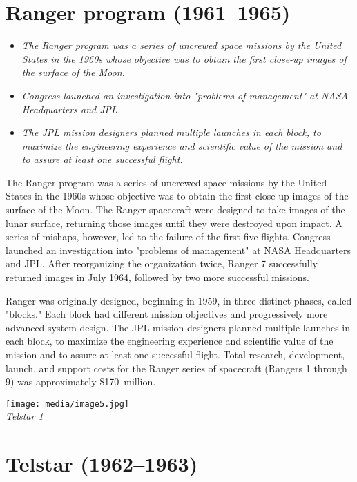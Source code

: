\section{Ranger program (1961--1965)}\label{ranger-program-19611965}

\begin{itemize}
\item
  \emph{The Ranger program was a series of uncrewed space missions by
  the United States in the 1960s whose objective was to obtain the first
  close-up images of the surface of the Moon.}
\item
  \emph{Congress launched an investigation into "problems of management"
  at NASA Headquarters and JPL.}
\item
  \emph{The JPL mission designers planned multiple launches in each
  block, to maximize the engineering experience and scientific value of
  the mission and to assure at least one successful flight.}
\end{itemize}

The Ranger program was a series of uncrewed space missions by the United
States in the 1960s whose objective was to obtain the first close-up
images of the surface of the Moon. The Ranger spacecraft were designed
to take images of the lunar surface, returning those images until they
were destroyed upon impact. A series of mishaps, however, led to the
failure of the first five flights. Congress launched an investigation
into "problems of management" at NASA Headquarters and JPL. After
reorganizing the organization twice, Ranger 7 successfully returned
images in July 1964, followed by two more successful missions.

Ranger was originally designed, beginning in 1959, in three distinct
phases, called "blocks." Each block had different mission objectives and
progressively more advanced system design. The JPL mission designers
planned multiple launches in each block, to maximize the engineering
experience and scientific value of the mission and to assure at least
one successful flight. Total research, development, launch, and support
costs for the Ranger series of spacecraft (Rangers 1 through 9) was
approximately \$170~million.

\texttt{[image: media/image5.jpg]}\\
\emph{Telstar 1}

\section{Telstar (1962--1963)}\label{telstar-19621963}

